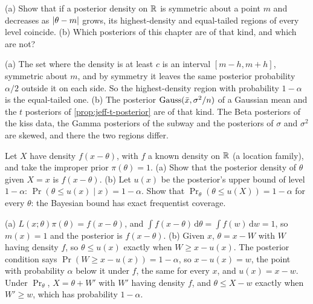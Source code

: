 \begin{exercise}
\label{ex:jeff-symmetric}
(a) Show that if a posterior density on $\mathbb{R}$ is symmetric about a point $m$ and decreases as $\lvert\theta - m\rvert$ grows, its highest-density and equal-tailed regions of every level coincide. (b) Which posteriors of this chapter are of that kind, and which are not?
\end{exercise}
\begin{solution}
(a) The set where the density is at least $c$ is an interval $[m - h, m + h]$, symmetric about $m$, and by symmetry it leaves the same posterior probability $\alpha/2$ outside it on each side. So the highest-density region with probability $1 - \alpha$ is the equal-tailed one. (b) The posterior $\text{Gauss}(\bar{x}, \sigma^2/n)$ of a Gaussian mean and the $t$ posteriors of \cref{prop:jeff-t-posterior} are of that kind. The Beta posteriors of the kiss data, the Gamma posteriors of the subway and the posteriors of $\sigma$ and $\sigma^2$ are skewed, and there the two regions differ.
\end{solution}

\begin{exercise}
\label{ex:jeff-location}
Let $X$ have density $f(x - \theta)$, with $f$ a known density on $\mathbb{R}$ (a location family), and take the improper prior $\pi(\theta) = 1$. (a) Show that the posterior density of $\theta$ given $X = x$ is $f(x - \theta)$. (b) Let $u(x)$ be the posterior's upper bound of level $1 - \alpha$: $\Pr(\theta \leq u(x) \mid x) = 1 - \alpha$. Show that $\Pr_\theta(\theta \leq u(X)) = 1 - \alpha$ for every $\theta$: the Bayesian bound has exact frequentist coverage.
\end{exercise}
\begin{solution}
(a) $L(x; \theta)\pi(\theta) = f(x - \theta)$, and $\int f(x - \theta)\,\mathrm{d}\theta = \int f(w)\,\mathrm{d}w = 1$, so $m(x) = 1$ and the posterior is $f(x - \theta)$. (b) Given $x$, $\theta = x - W$ with $W$ having density $f$, so $\theta \leq u(x)$ exactly when $W \geq x - u(x)$. The posterior condition says $\Pr(W \geq x - u(x)) = 1 - \alpha$, so $x - u(x) = w$, the point with probability $\alpha$ below it under $f$, the same for every $x$, and $u(x) = x - w$. Under $\Pr_\theta$, $X = \theta + W'$ with $W'$ having density $f$, and $\theta \leq X - w$ exactly when $W' \geq w$, which has probability $1 - \alpha$.
\end{solution}

